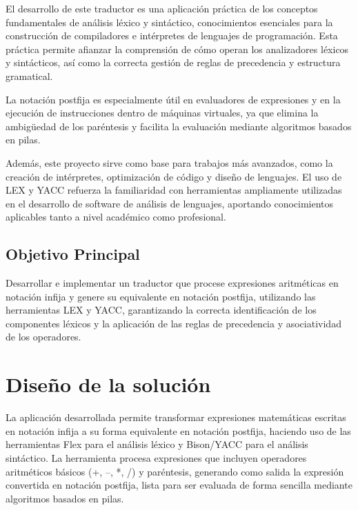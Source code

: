 \documentclass{article}
\begin{document}
El desarrollo de este traductor es una aplicación práctica de los conceptos fundamentales de análisis léxico y sintáctico, conocimientos esenciales para la construcción de compiladores e intérpretes de lenguajes de programación. Esta práctica permite afianzar la comprensión de cómo operan los analizadores léxicos y sintácticos, así como la correcta gestión de reglas de precedencia y estructura gramatical.  

La notación postfija es especialmente útil en evaluadores de expresiones y en la ejecución de instrucciones dentro de máquinas virtuales, ya que elimina la ambigüedad de los paréntesis y facilita la evaluación mediante algoritmos basados en pilas.  

Además, este proyecto sirve como base para trabajos más avanzados, como la creación de intérpretes, optimización de código y diseño de lenguajes. El uso de LEX y YACC refuerza la familiaridad con herramientas ampliamente utilizadas en el desarrollo de software de análisis de lenguajes, aportando conocimientos aplicables tanto a nivel académico como profesional.

\subsection{Objetivo Principal}

Desarrollar e implementar un traductor que procese expresiones aritméticas en notación infija y genere su equivalente en notación postfija, utilizando las herramientas LEX y YACC, garantizando la correcta identificación de los componentes léxicos y la aplicación de las reglas de precedencia y asociatividad de los operadores.

\section{Diseño de la solución}\label{sec:dis}

La aplicación desarrollada permite transformar expresiones matemáticas escritas en notación infija a su forma equivalente en notación postfija, haciendo uso de las herramientas Flex para el análisis léxico y Bison/YACC para el análisis sintáctico. La herramienta procesa expresiones que incluyen operadores aritméticos básicos (+, –, *, /) y paréntesis, generando como salida la expresión convertida en notación postfija, lista para ser evaluada de forma sencilla mediante algoritmos basados en pilas.
\end{document}
